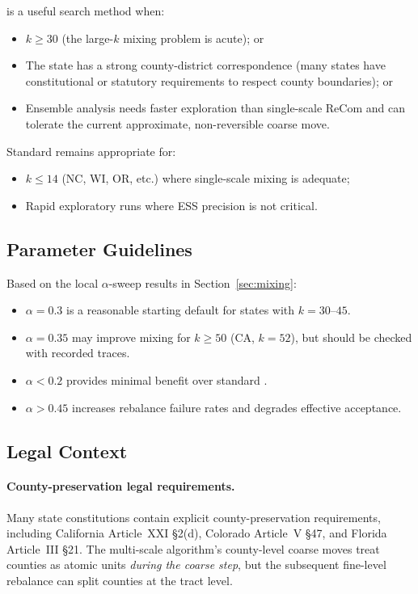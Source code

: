 \ms{} is a useful search method when:
\begin{itemize}
  \item $k \geq 30$ (the large-$k$ mixing problem is acute); or
  \item The state has a strong county-district correspondence (many states
        have constitutional or statutory requirements to respect county
        boundaries); or
  \item Ensemble analysis needs faster exploration than single-scale ReCom and
        can tolerate the current approximate, non-reversible coarse move.
\end{itemize}

Standard \recom{} remains appropriate for:
\begin{itemize}
  \item $k \leq 14$ (NC, WI, OR, etc.) where single-scale mixing is adequate;
  \item Rapid exploratory runs where ESS precision is not critical.
\end{itemize}

\subsection{Parameter Guidelines}

Based on the local $\alpha$-sweep results in Section~\ref{sec:mixing}:
\begin{itemize}
  \item $\alpha = 0.3$ is a reasonable starting default for states with $k = 30$--$45$.
  \item $\alpha = 0.35$ may improve mixing for $k \geq 50$ (CA, $k = 52$), but
        should be checked with recorded traces.
  \item $\alpha < 0.2$ provides minimal benefit over standard \recom{}.
  \item $\alpha > 0.45$ increases rebalance failure rates and degrades
        effective acceptance.
\end{itemize}

\subsection{Legal Context}

\paragraph{County-preservation legal requirements.}
Many state constitutions contain explicit county-preservation requirements,
including California Article~XXI \S2(d), Colorado Article~V \S47, and Florida
Article~III \S21.
The multi-scale algorithm's county-level coarse moves treat counties as atomic
units \emph{during the coarse step}, but the subsequent fine-level rebalance can
split counties at the tract level.

